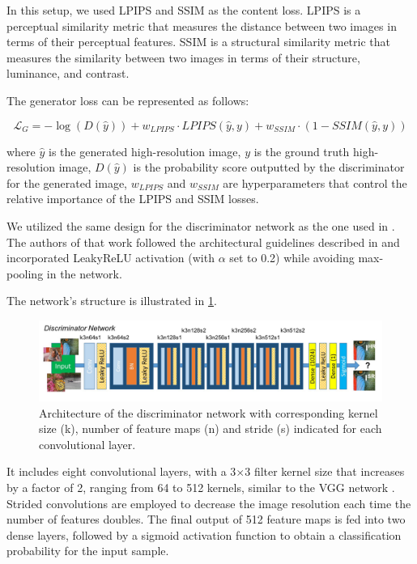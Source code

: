 In this setup, we used LPIPS and SSIM as the content loss. LPIPS is a perceptual similarity metric that measures the distance between two images in terms of their perceptual features. SSIM is a structural similarity metric that measures the similarity between two images in terms of their structure, luminance, and contrast.

The generator loss can be represented as follows:

$$\mathcal{L}_{G} = -\log(D(\hat{y})) + w_{LPIPS}\cdot LPIPS(\hat{y}, y) + w_{SSIM} \cdot (1 - SSIM(\hat{y}, y))$$

where $\hat{y}$ is the generated high-resolution image, $y$ is the ground truth high-resolution image, $D(\hat{y})$ is the probability score outputted by the discriminator for the generated image, $w_{LPIPS}$ and $w_{SSIM}$ are hyperparameters that control the relative importance of the LPIPS and SSIM losses.

We utilized the same design for the discriminator network as the one used in \cite{ledig2017photo}. The authors of that work followed the architectural guidelines described in \cite{radford2015unsupervised} and incorporated LeakyReLU activation (with $\alpha$ set to 0.2) while avoiding max-pooling in the network.

The network's structure is illustrated in \cref{fig:discriminator}.

\begin{figure}[ht]
\centering
\includegraphics[width=1.0\textwidth]{static/discriminator_architecture.png}
\caption{Architecture of the discriminator network with corresponding kernel size (k), number of feature maps (n) and stride (s) indicated for each convolutional layer.}
\label{fig:discriminator}
\end{figure}

It includes eight convolutional layers, with a 3$\times$3 filter kernel size that increases by a factor of 2, ranging from 64 to 512 kernels, similar to the VGG network \cite{simonyan2014very}. Strided convolutions are employed to decrease the image resolution each time the number of features doubles. The final output of 512 feature maps is fed into two dense layers, followed by a sigmoid activation function to obtain a classification probability for the input sample.

